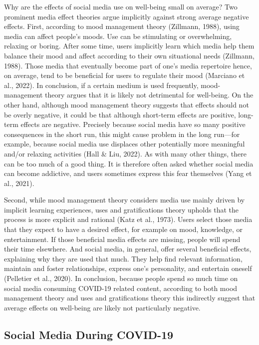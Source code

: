 \documentclass[
  man,mask,floatsintext]{apa7}
\begin{document}
Why are the effects of social media use on well-being small on average?
Two prominent media effect theories argue implicitly against strong average negative effects.
First, according to mood management theory (Zillmann, 1988), using media can affect people's moods.
Use can be stimulating or overwhelming, relaxing or boring.
After some time, users implicitly learn which media help them balance their mood and affect according to their own situational needs (Zillmann, 1988).
Those media that eventually become part of one's media repertoire hence, on average, tend to be beneficial for users to regulate their mood (Marciano et al., 2022).
In conclusion, if a certain medium is used frequently, mood-management theory argues that it is likely not detrimental for well-being.
On the other hand, although mood management theory suggests that effects should not be overly negative, it could be that although short-term effects are positive, long-term effects are negative.
Precisely because social media have so many positive consequences in the short run, this might cause problem in the long run---for example, because social media use displaces other potentially more meaningful and/or relaxing activities (Hall \& Liu, 2022).
As with many other things, there can be too much of a good thing.
It is therefore often asked whether social media can become addictive, and users sometimes express this fear themselves (Yang et al., 2021).

Second, while mood management theory considers media use mainly driven by implicit learning experiences, uses and gratifications theory upholds that the process is more explicit and rational (Katz et al., 1973).
Users select those media that they expect to have a desired effect, for example on mood, knowledge, or entertainment.
If those beneficial media effects are missing, people will spend their time elsewhere.
And social media, in general, offer several beneficial effects, explaining why they are used that much.
They help find relevant information, maintain and foster relationships, express one's personality, and entertain oneself (Pelletier et al., 2020).
In conclusion, because people spend so much time on social media consuming COVID-19 related content, according to both mood management theory and uses and gratifications theory this indirectly suggest that average effects on well-being are likely not particularly negative.

\hypertarget{social-media-during-covid-19}{%
\subsection{Social Media During COVID-19}\label{social-media-during-covid-19}}
\end{document}
